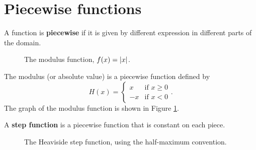 \section{Piecewise functions}

\begin{definition}
    A function is \textbf{piecewise} if it is given by different expression in different parts of the domain.
\end{definition}

\begin{figure}
    \centering
    \caption{The modulus function, $f(x) = \lvert x\rvert$.}
    \label{fig:modulus_function_graph}
\end{figure}

\begin{example}
    The modulus (or absolute value) is a piecewise function defined by
    \[
        H(x)=
        \begin{cases} 
            x & \text{if }x\geq0\\
            -x & \text{if }x<0
        \end{cases}
        .
    \]
    The graph of the modulus function is shown in Figure \ref{fig:modulus_function_graph}.
\end{example}

\begin{definition}
    A \textbf{step function} is a piecewise function that is constant on each piece.
\end{definition}

\begin{figure}
    \centering
    \caption{The Heaviside step function, using the half-maximum convention.}
    \label{fig:heaviside_graph}
\end{figure}

